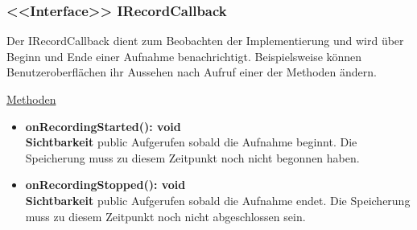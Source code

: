 \subsubsection{<<Interface>> IRecordCallback} \label{app:klasse:IRecordCallback}
Der IRecordCallback dient zum Beobachten der  Implementierung und wird über Beginn und Ende einer Aufnahme benachrichtigt. Beispielsweise können Benutzeroberflächen ihr Aussehen nach Aufruf einer der Methoden ändern.
\newline

\underline{Methoden}
\begin{itemize}
\itemsep0pt

\item \textbf{onRecordingStarted(): void}\hfill\\
\textbf{Sichtbarkeit} public\newline
Aufgerufen sobald die Aufnahme beginnt. Die Speicherung muss zu diesem Zeitpunkt noch nicht begonnen haben.

\item \textbf{onRecordingStopped(): void}\hfill\\
\textbf{Sichtbarkeit} public\newline
Aufgerufen sobald die Aufnahme endet. Die Speicherung muss zu diesem Zeitpunkt noch nicht abgeschlossen sein.

\end{itemize}